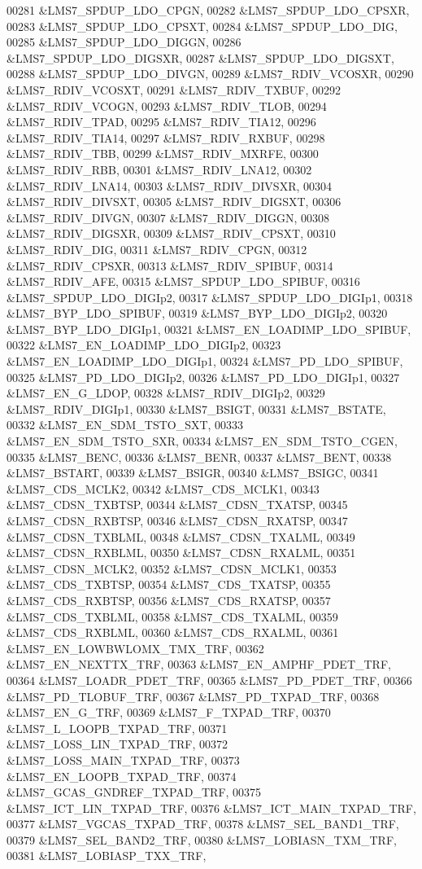 \begin{DoxyCode}
00281 &LMS7_SPDUP_LDO_CPGN,
00282 &LMS7_SPDUP_LDO_CPSXR,
00283 &LMS7_SPDUP_LDO_CPSXT,
00284 &LMS7_SPDUP_LDO_DIG,
00285 &LMS7_SPDUP_LDO_DIGGN,
00286 &LMS7_SPDUP_LDO_DIGSXR,
00287 &LMS7_SPDUP_LDO_DIGSXT,
00288 &LMS7_SPDUP_LDO_DIVGN,
00289 &LMS7_RDIV_VCOSXR,
00290 &LMS7_RDIV_VCOSXT,
00291 &LMS7_RDIV_TXBUF,
00292 &LMS7_RDIV_VCOGN,
00293 &LMS7_RDIV_TLOB,
00294 &LMS7_RDIV_TPAD,
00295 &LMS7_RDIV_TIA12,
00296 &LMS7_RDIV_TIA14,
00297 &LMS7_RDIV_RXBUF,
00298 &LMS7_RDIV_TBB,
00299 &LMS7_RDIV_MXRFE,
00300 &LMS7_RDIV_RBB,
00301 &LMS7_RDIV_LNA12,
00302 &LMS7_RDIV_LNA14,
00303 &LMS7_RDIV_DIVSXR,
00304 &LMS7_RDIV_DIVSXT,
00305 &LMS7_RDIV_DIGSXT,
00306 &LMS7_RDIV_DIVGN,
00307 &LMS7_RDIV_DIGGN,
00308 &LMS7_RDIV_DIGSXR,
00309 &LMS7_RDIV_CPSXT,
00310 &LMS7_RDIV_DIG,
00311 &LMS7_RDIV_CPGN,
00312 &LMS7_RDIV_CPSXR,
00313 &LMS7_RDIV_SPIBUF,
00314 &LMS7_RDIV_AFE,
00315 &LMS7_SPDUP_LDO_SPIBUF,
00316 &LMS7_SPDUP_LDO_DIGIp2,
00317 &LMS7_SPDUP_LDO_DIGIp1,
00318 &LMS7_BYP_LDO_SPIBUF,
00319 &LMS7_BYP_LDO_DIGIp2,
00320 &LMS7_BYP_LDO_DIGIp1,
00321 &LMS7_EN_LOADIMP_LDO_SPIBUF,
00322 &LMS7_EN_LOADIMP_LDO_DIGIp2,
00323 &LMS7_EN_LOADIMP_LDO_DIGIp1,
00324 &LMS7_PD_LDO_SPIBUF,
00325 &LMS7_PD_LDO_DIGIp2,
00326 &LMS7_PD_LDO_DIGIp1,
00327 &LMS7_EN_G_LDOP,
00328 &LMS7_RDIV_DIGIp2,
00329 &LMS7_RDIV_DIGIp1,
00330 &LMS7_BSIGT,
00331 &LMS7_BSTATE,
00332 &LMS7_EN_SDM_TSTO_SXT,
00333 &LMS7_EN_SDM_TSTO_SXR,
00334 &LMS7_EN_SDM_TSTO_CGEN,
00335 &LMS7_BENC,
00336 &LMS7_BENR,
00337 &LMS7_BENT,
00338 &LMS7_BSTART,
00339 &LMS7_BSIGR,
00340 &LMS7_BSIGC,
00341 &LMS7_CDS_MCLK2,
00342 &LMS7_CDS_MCLK1,
00343 &LMS7_CDSN_TXBTSP,
00344 &LMS7_CDSN_TXATSP,
00345 &LMS7_CDSN_RXBTSP,
00346 &LMS7_CDSN_RXATSP,
00347 &LMS7_CDSN_TXBLML,
00348 &LMS7_CDSN_TXALML,
00349 &LMS7_CDSN_RXBLML,
00350 &LMS7_CDSN_RXALML,
00351 &LMS7_CDSN_MCLK2,
00352 &LMS7_CDSN_MCLK1,
00353 &LMS7_CDS_TXBTSP,
00354 &LMS7_CDS_TXATSP,
00355 &LMS7_CDS_RXBTSP,
00356 &LMS7_CDS_RXATSP,
00357 &LMS7_CDS_TXBLML,
00358 &LMS7_CDS_TXALML,
00359 &LMS7_CDS_RXBLML,
00360 &LMS7_CDS_RXALML,
00361 &LMS7_EN_LOWBWLOMX_TMX_TRF,
00362 &LMS7_EN_NEXTTX_TRF,
00363 &LMS7_EN_AMPHF_PDET_TRF,
00364 &LMS7_LOADR_PDET_TRF,
00365 &LMS7_PD_PDET_TRF,
00366 &LMS7_PD_TLOBUF_TRF,
00367 &LMS7_PD_TXPAD_TRF,
00368 &LMS7_EN_G_TRF,
00369 &LMS7_F_TXPAD_TRF,
00370 &LMS7_L_LOOPB_TXPAD_TRF,
00371 &LMS7_LOSS_LIN_TXPAD_TRF,
00372 &LMS7_LOSS_MAIN_TXPAD_TRF,
00373 &LMS7_EN_LOOPB_TXPAD_TRF,
00374 &LMS7_GCAS_GNDREF_TXPAD_TRF,
00375 &LMS7_ICT_LIN_TXPAD_TRF,
00376 &LMS7_ICT_MAIN_TXPAD_TRF,
00377 &LMS7_VGCAS_TXPAD_TRF,
00378 &LMS7_SEL_BAND1_TRF,
00379 &LMS7_SEL_BAND2_TRF,
00380 &LMS7_LOBIASN_TXM_TRF,
00381 &LMS7_LOBIASP_TXX_TRF,

\end{DoxyCode}
